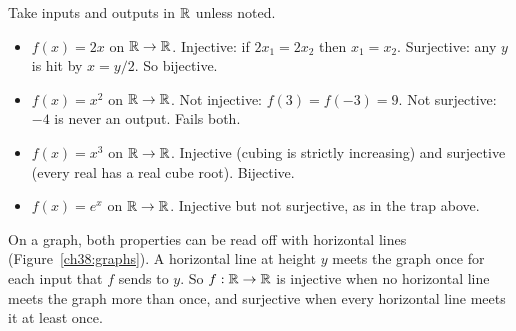 \begin{example}\label{ch38:smallmaps}
Take inputs and outputs in $\mathbb{R}$ unless noted.
\begin{itemize}
  \item $f(x) = 2x$ on $\mathbb{R} \to \mathbb{R}$. Injective: if $2x_1 = 2x_2$ then $x_1 = x_2$.
        Surjective: any $y$ is hit by $x = y/2$. So bijective.
  \item $f(x) = x^2$ on $\mathbb{R} \to \mathbb{R}$. Not injective: $f(3) = f(-3) = 9$. Not surjective:
        $-4$ is never an output. Fails both.
  \item $f(x) = x^3$ on $\mathbb{R} \to \mathbb{R}$. Injective (cubing is strictly increasing) and
        surjective (every real has a real cube root). Bijective.
  \item $f(x) = e^x$ on $\mathbb{R} \to \mathbb{R}$. Injective but not surjective, as in the trap above.
\end{itemize}
\end{example}

On a graph, both properties can be read off with horizontal lines
(Figure~\ref{ch38:graphs}). A horizontal line at height $y$ meets the graph once for each
input that $f$ sends to $y$. So $f:\mathbb{R}\to\mathbb{R}$ is injective when no horizontal line meets the
graph more than once, and surjective when every horizontal line meets it at least once.

